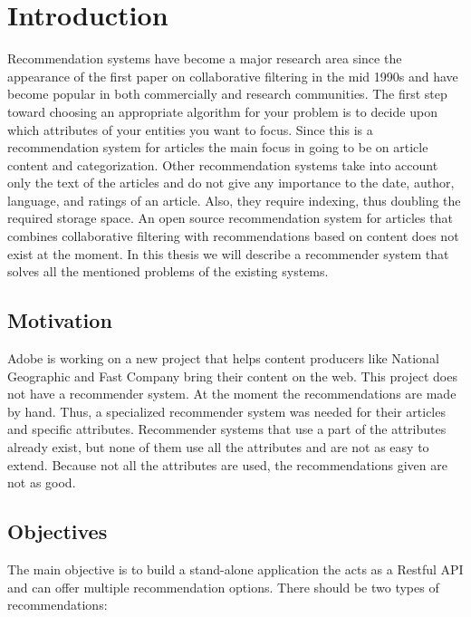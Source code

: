 \chapter{Introduction}
\label{chapter:intro}

Recommendation systems have become a major research area since the appearance of the first paper on collaborative filtering in the mid 1990s and have become popular in both commercially and research communities. The first step toward choosing an appropriate algorithm for your problem is to decide upon which attributes of your entities you want to focus. Since this is a recommendation system for articles the main focus in going to be on article content and categorization. Other recommendation systems take into account only the text of the articles and do not give any importance to the date, author, language, and ratings of an article. Also, they require indexing, thus doubling the required storage space. An open source recommendation system for articles that combines collaborative filtering with recommendations based on content does not exist at the moment. In this thesis we will describe a recommender system that solves all the mentioned problems of the existing systems.\\

\section{Motivation}
\label{sec:motivation}
Adobe is working on a new project that helps content producers like National Geographic and Fast Company bring their content on the web. This project does not have a recommender system. At the moment the recommendations are made by hand. Thus, a specialized recommender system was needed for their articles and specific attributes. Recommender systems that use a part of the attributes already exist, but none of them use all the attributes and are not as easy to extend. Because not all the attributes are used, the recommendations given are not as good.

\section{Objectives}
\label{sec:objectives}
The main objective is to build a stand-alone application the acts as a Restful API and can offer multiple recommendation options. There should be two types of recommendations:

